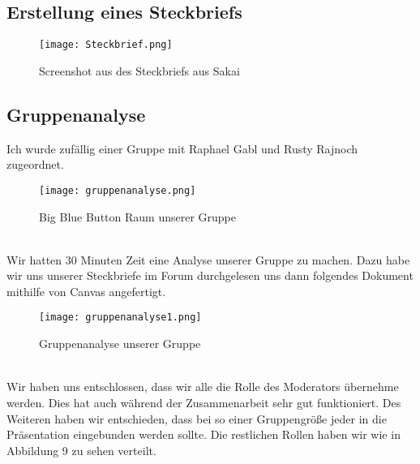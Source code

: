 \documentclass[12pt]{article}
\begin{document}
\subsection{Erstellung eines Steckbriefs}
\begin{figure}[h]
 \begin{center}
  \texttt{[image: Steckbrief.png]}
 \end{center}
 \caption{Screenshot aus des Steckbriefs aus Sakai}
\end{figure}
\subsection{Gruppenanalyse}
Ich wurde zufällig einer Gruppe mit Raphael Gabl und Rusty Rajnoch zugeordnet.
\begin{figure}[h]
 \begin{center}
  \texttt{[image: gruppenanalyse.png]}
 \end{center}
 \caption{Big Blue Button Raum unserer Gruppe}
\end{figure}\\
Wir hatten 30 Minuten Zeit eine Analyse unserer Gruppe zu machen. Dazu habe wir uns unserer Steckbriefe im Forum durchgelesen uns dann folgendes Dokument mithilfe von Canvas angefertigt.
\pagebreak
\begin{figure}[h]
 \begin{center}
  \texttt{[image: gruppenanalyse1.png]}
 \end{center}
 \caption{Gruppenanalyse unserer Gruppe}
\end{figure}\\
Wir haben uns entschlossen, dass wir alle die Rolle des Moderators übernehme werden. Dies hat auch während der Zusammenarbeit sehr gut funktioniert. Des Weiteren haben wir entschieden, dass bei so einer Gruppengröße jeder in die Präsentation eingebunden werden sollte. Die restlichen Rollen haben wir wie in Abbildung 9 zu sehen verteilt.
\end{document}
